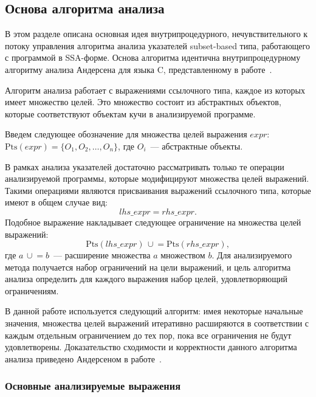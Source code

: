 \documentclass[14pt,titlepage]{extarticle}
\newcommand{\Pts}[1]{\textrm{Pts}(#1)}
\newcommand{\cupe}{\,\cup\!\!=}
\newcommand{\eng}[1]{{\English#1}}
\begin{document}
    \subsection{Основа алгоритма анализа}
      \label{section:algorithm_basis}

      В этом разделе описана основная идея внутрипроцедурного,
      нечувствительного к потоку управления алгоритма анализа указателей
      \eng{subset-based} типа, работающего с программой в SSA-форме. Основа
      алгоритма идентична внутрипроцедурному алгоритму анализа Андерсена для
      языка C, представленному в работе~\cite{andersen}.

      Алгоритм анализа работает с выражениями ссылочного типа, каждое из
      которых имеет множество целей. Это множество состоит из абстрактных
      объектов, которые соответствуют объектам кучи в анализируемой программе.

      Введем следующее обозначение для множества целей выражения $expr$:
      $\Pts{expr} = \{O_1, O_2, \ldots, O_n\}$, где $O_i$~--- абстрактные объекты.

      В рамках анализа указателей достаточно рассматривать только те операции
      анализируемой программы, которые модифицируют множества целей выражений.
      Такими операциями являются присваивания выражений ссылочного типа,
      которые имеют в общем случае вид:
      \[lhs\_expr = rhs\_expr.\]
      Подобное выражение накладывает следующее ограничение на множества целей
      выражений:
      \[\Pts{lhs\_expr} \cupe \Pts{rhs\_expr},\]
      где $a \cupe b$~--- расширение множества $a$ множеством $b$.
      Для анализируемого метода получается набор ограничений на цели выражений,
      и цель алгоритма анализа определить для каждого выражения набор целей,
      удовлетворяющий ограничениям.

      В данной работе используется следующий алгоритм: имея некоторые
      начальные значения, множества целей выражений итеративно расширяются в
      соответствии с каждым отдельным ограничением до тех пор, пока все
      ограничения не будут удовлетворены. Доказательство сходимости и
      корректности данного алгоритма анализа приведено Андерсеном в
      работе~\cite{andersen}.

      \subsubsection{Основные анализируемые выражения}
        \label{section:pts_providers}
\end{document}
